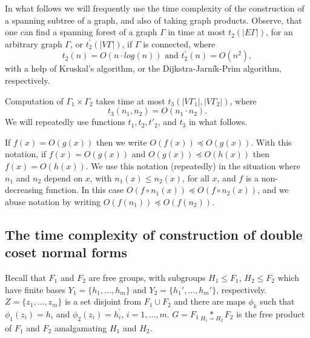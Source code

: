 \documentclass[a4paper,12pt]{article}
\newcommand{\G}{\Gamma }
\numberwithin{equation}{section}
\numberwithin{figure}{section}
\begin{document}
In what follows we will  frequently  use the time complexity of the
 construction of a spanning subtree of a graph, and also of taking graph
products.
Observe, that one can find a spanning forest of a graph $\G$ in
time at most $t_2(|E\G|)$, for an arbitrary graph $\G$,
or $t^{\prime}_2(|V\G|)$, if $\G$ is  connected, where
\begin{equation}\label{t2}
t_2(n) = O(n \cdot log(n)) {\textrm{ and }} t^{\prime}_2(n) =
O(n^2),
\end{equation}
with a help of Kruskal's algorithm, or
the Dijkstra-Jarn\'{i}k-Prim  algorithm, respectively.

Computation of $\G_1 \times \G_2$ takes time at most $t_3(|V\G_1|,
|V\G_2|)$, where
\begin{equation}\label{t3}
t_3(n_1, n_2) = O(n_1 \cdot n_2).
\end{equation}
We will repeatedly use  functions $t_1, t_2, t'_2$,
and $t_3$ in what follows.

If $f(x)=O(g(x))$ then we write $O(f(x))\preceq O(g(x))$. With
this notation, if $f(x)=O(g(x))$ and $O(g(x))\preceq O(h(x))$ then
$f(x)=O(h(x))$.  We use this notation (repeatedly) in the situation
where $n_1$ and $n_2$ depend on $x$, with $n_1(x)\le n_2(x)$, for all $x$,
and $f$ is a non-decreasing function. In this case
$O(f\circ n_1(x))\preceq O(f\circ n_2(x))$, and we abuse notation by
writing $O(f(n_1)) \preceq O(f(n_2))$.


\subsection{The time complexity of construction of double coset normal forms}\label{sub:doubleCo_nf}

Recall that $F_1$ and  $F_2$ are free groups, with subgroups $H_1 \leq
F_1$, $H_2 \leq F_2$ which have finite bases $Y_1 = \{h_1, \ldots, h_m
\}$ and $Y_2=\{h_1', \ldots, h_m'\}$, respectively.  $Z=\{z_1,\ldots ,z_m\}$
is a set disjoint from $F_1\cup F_2$ and there are
maps $\phi_k$ such that $\phi_1(z_i)=h_i$ and
$\phi_2(z_i)=h^\prime_i$, $i=1,\ldots ,m$.
 $G = F_1 \underset{H_1=H_2}{\ast} F_2$ is the free product of $F_1$ and $F_2$
amalgamating $H_1$ and $H_2$.
\end{document}
